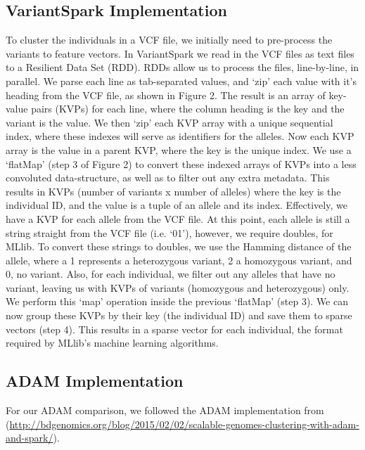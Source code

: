 \documentclass{bmcart}
\newcommand{\variantSpark}{{\sc VariantSpark}}
\begin{document}
\subsection*{VariantSpark Implementation}
To cluster the individuals in a VCF file, we initially need to pre-process the variants to feature vectors.
In \variantSpark{} we read in the VCF files as text files to a Resilient Data Set (RDD). RDDs allow us to process the files, line-by-line, in parallel. We parse each line as tab-separated values, and `zip' each value with it's heading from the VCF file, as shown in Figure 2.
The result is an array of key-value pairs (KVPs) for each line, where the column heading is the key and the variant is the value.
We then `zip' each KVP array with a unique sequential index, where these indexes will serve as identifiers for the alleles.
Now each KVP array is the value in a parent KVP, where the key is the unique index.
We use a `flatMap' (step 3 of Figure 2) to convert these indexed arrays of KVPs into a less convoluted data-structure, as well as to filter out any extra metadata.
This results in KVPs (number of variants x number of alleles) where the key is the individual ID, and the value is a tuple of an allele and its index. Effectively, we have a KVP for each allele from the VCF file.
At this point, each allele is still a string straight from the VCF file (i.e. `0\textbar{}1'), however, we require doubles, for MLlib.
To convert these strings to doubles, we use the Hamming distance of the allele, where a 1 represents a heterozygous variant, 2 a homozygous variant, and 0, no variant. Also, for each individual, we filter out any alleles that have no variant, leaving us with KVPs of variants (homozygous and heterozygous) only.
We perform this `map' operation inside the previous `flatMap' (step 3).
We can now group these KVPs by their key (the individual ID) and save them to sparse vectors (step 4). This results in a sparse vector for each individual, the format required by MLlib's machine learning algorithms.


\subsection*{{\sc ADAM} Implementation}
For our {\sc ADAM} comparison, we followed the {\sc ADAM} implementation from (\url{http://bdgenomics.org/blog/2015/02/02/scalable-genomes-clustering-with-adam-and-spark/}).
\end{document}
